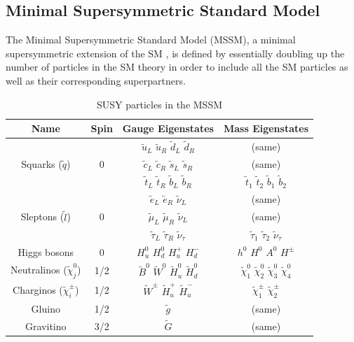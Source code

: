 		\subsection*{Minimal Supersymmetric Standard Model}
			
			The Minimal Supersymmetric Standard Model (MSSM), a minimal supersymmetric extension of the SM \cite{Jegerlehner:2013nna}, is defined by essentially doubling up the number of particles in the SM theory in order to include all the SM particles as well as their corresponding superpartners.

			\begin{table}[!htb]\centering\caption{SUSY particles in the MSSM}							
				\begin{tabular}{|c|c|c|c|}
					\hline
					Name & Spin & Gauge Eigenstates & Mass Eigenstates \\ \hline \hline
					
					\multirow{3}{*}{Squarks ($\tilde{q}$)} & \multirow{3}{*}{0} 
					& $\tilde{u}_L$ $\tilde{u}_R$ $\tilde{d}_L$ $\tilde{d}_R$ & (same) \\
					& & $\tilde{c}_L$ $\tilde{c}_R$ $\tilde{s}_L$ $\tilde{s}_R$ & (same) \\
					& & $\tilde{t}_L$ $\tilde{t}_R$ $\tilde{b}_L$ $\tilde{b}_R$ & $\tilde{t}_1$ $\tilde{t}_2$ $\tilde{b}_1$ $\tilde{b}_2$ \\ \hline

					\multirow{3}{*}{Sleptons ($\tilde{l}$)} & \multirow{3}{*}{0} 
					& $\tilde{e}_L$ $\tilde{e}_R$ $\tilde{\nu}_L$ & (same) \\
					& & $\tilde{\mu}_L$ $\tilde{\mu}_R$ $\tilde{\nu}_L$ & (same) \\ 
					& & $\tilde{\tau}_L$ $\tilde{\tau}_R$ $\tilde{\nu}_{\tau}$ & $\tilde{\tau}_1$ $\tilde{\tau}_2$ $\tilde{\nu}_{\tau}$ \\ \hline
					
					Higgs bosons & 0 & $H_u^0$ $H_d^0$ $H_u^+$ $H_d^-$ & $h^0$ $H^0$ $A^0$ $H^{\pm}$ \\ \hline 

					Neutralinos ($\tilde{\chi}_j^0$)   & 1/2 & $\tilde{B}^0$ $\tilde{W}^0$ $\tilde{H}_u^0$ $\tilde{H}_d^0$ & $\tilde{\chi}_1^0$ $\tilde{\chi}_2^0$ $\tilde{\chi}_3^0$ $\tilde{\chi}_4^0$\\
					Charginos ($\tilde{\chi}_i^{\pm}$) & 1/2 & $\tilde{W}^{\pm}$ $\tilde{H}_u^+$ $\tilde{H}_u^-$ & $\tilde{\chi}_1^{\pm}$ $\tilde{\chi}_2^{\pm}$ \\ \hline

					Gluino & 1/2 & $\tilde{g}$ & (same) \\
					Gravitino & 3/2 & $\tilde{G}$ & (same) \\ \hline					
				\end{tabular}						
			\label{tab:MSSM_particles} 
			\end{table}


